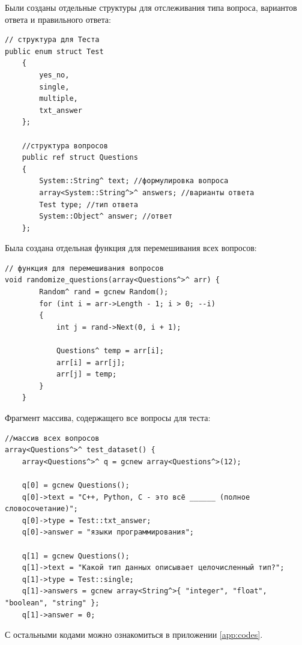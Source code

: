 Были созданы отдельные структуры для отслеживания типа вопроса, вариантов ответа и правильного ответа:
\begin{verbatim}
// структура для Теста
public enum struct Test
    {
        yes_no,
        single,
        multiple,
        txt_answer
    };

    //структура вопросов
    public ref struct Questions
    {
        System::String^ text; //формулировка вопроса
        array<System::String^>^ answers; //варианты ответа
        Test type; //тип ответа
        System::Object^ answer; //ответ 
    };
\end{verbatim}

Была создана отдельная функция для перемешивания всех вопросов:
\begin{verbatim}
// функция для перемешивания вопросов
void randomize_questions(array<Questions^>^ arr) {
        Random^ rand = gcnew Random();
        for (int i = arr->Length - 1; i > 0; --i)
        {
            int j = rand->Next(0, i + 1);

            Questions^ temp = arr[i];
            arr[i] = arr[j];
            arr[j] = temp;
        }
    }
\end{verbatim}

Фрагмент массива, содержащего все вопросы для теста:
\begin{verbatim}
//массив всех вопросов 
array<Questions^>^ test_dataset() {
    array<Questions^>^ q = gcnew array<Questions^>(12);

    q[0] = gcnew Questions();
    q[0]->text = "C++, Python, C - это всё ______ (полное словосочетание)";
    q[0]->type = Test::txt_answer;
    q[0]->answer = "языки программирования";

    q[1] = gcnew Questions();
    q[1]->text = "Какой тип данных описывает целочисленный тип?";
    q[1]->type = Test::single;
    q[1]->answers = gcnew array<String^>{ "integer", "float", "boolean", "string" };
    q[1]->answer = 0;
\end{verbatim}

С остальными кодами можно ознакомиться в приложении \ref{app:codes}.

